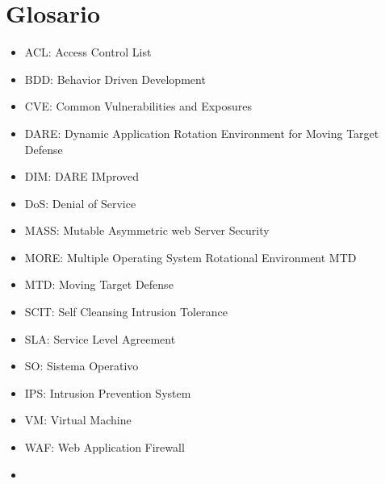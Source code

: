 \chapter{Glosario}

\begin{itemize}
    \item ACL: Access Control List
    \item BDD: Behavior Driven Development
    \item CVE: Common Vulnerabilities and Exposures
    \item DARE: Dynamic Application Rotation Environment for Moving Target Defense
    \item DIM: DARE IMproved
    \item DoS: Denial of Service
    \item MASS: Mutable Asymmetric web Server Security
    \item MORE: Multiple Operating System Rotational Environment MTD
    \item MTD: Moving Target Defense
    \item SCIT: Self Cleansing Intrusion Tolerance
    \item SLA: Service Level Agreement
    \item SO: Sistema Operativo
    \item IPS: Intrusion Prevention System
    \item VM: Virtual Machine
    \item WAF: Web Application Firewall
    \item
  \end{itemize}
  